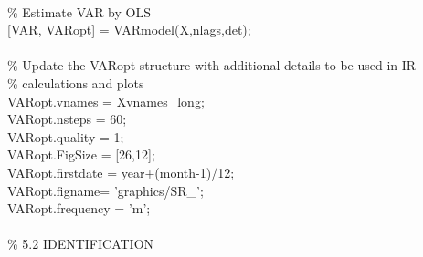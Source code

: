 \hspace{1mm}\hspace{5mm}  \\ 
\hspace{1mm}\hspace{5mm} \textcolor{matlabgreen}{\% Estimate VAR by OLS }\\ 
\hspace{1mm}\hspace{5mm} [VAR, VARopt] = VARmodel(X,nlags,det); \\ 
\hspace{1mm}\hspace{5mm}  \\ 
\hspace{1mm}\hspace{5mm} \textcolor{matlabgreen}{\% Update the VARopt structure with additional details to be used in IR  }\\ 
\hspace{1mm}\hspace{5mm} \textcolor{matlabgreen}{\% calculations and plots }\\ 
\hspace{1mm}\hspace{5mm} VARopt.vnames = Xvnames\_long; \\ 
\hspace{1mm}\hspace{5mm} VARopt.nsteps = 60; \\ 
\hspace{1mm}\hspace{5mm} VARopt.quality = 1; \\ 
\hspace{1mm}\hspace{5mm} VARopt.FigSize = [26,12]; \\ 
\hspace{1mm}\hspace{5mm} VARopt.firstdate = year+(month-1)/12; \\ 
\hspace{1mm}\hspace{5mm} VARopt.figname= \textcolor{matlabpurple}{'graphics/SR\_'}; \\ 
\hspace{1mm}\hspace{5mm} VARopt.frequency = \textcolor{matlabpurple}{'m'}; \\ 
\hspace{1mm}\hspace{5mm}  \\ 
\hspace{1mm}\hspace{5mm} \textcolor{matlabgreen}{\% 5.2 IDENTIFICATION }\\ 
